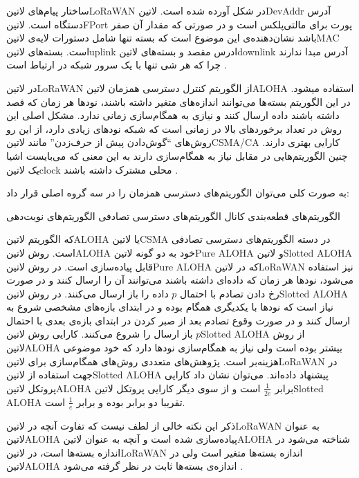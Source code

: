 ساختار پیام‌های ‌لاتین{LoRaWAN} در شکل  آورده شده است. ‌لاتین{DevAddr} آدرس دستگاه است.
‌لاتین{FPort} پورت برای مالتی‌پلکس است و در صورتی که مقدار آن صفر باشد نشان‌دهنده‌ی این موضوع است که بسته تنها شامل
دستورات لایه‌ی ‌لاتین{MAC} است. بسته‌های ‌لاتین{uplink} ادرس مقصد و بسته‌های ‌لاتین{downlink} آدرس مبدا ندارند
چرا که هر شی تنها با یک سرور شبکه در ارتباط است
.

در ‌لاتین{LoRaWAN} از الگوریتم کنترل دسترسی همزمان ‌لاتین{ALOHA} استفاده میشود. در این الگوریتم بسته‌ها می‌توانند اندازه‌های متغیر داشته باشند، نودها هر زمان که قصد داشته باشند داده ارسال کنند و نیازی به همگام‌سازی زمانی ندارد.
مشکل اصلی این روش در تعداد برخوردهای بالا در زمانی است که شبکه نودهای زیادی دارد، از این رو روش‌های ``گوش‌دادن پیش از حرف‌زدن'' مانند ‌لاتین{CSMA/CA} کارایی بهتری دارند.
چنین الگوریتم‌هایی در مقابل نیاز به همگام‌سازی دارند به این معنی که می‌بایست اشیا یک ‌لاتین{clock} محلی مشترک داشته باشند
.

به صورت کلی می‌توان الگوریتم‌های دسترسی همزمان را در سه گروه اصلی قرار داد:

 الگوریتم‌های قطعه‌بندی کانال
 الگوریتم‌های دسترسی تصادفی
 الگوریتم‌های نوبت‌دهی

که الگوریتم ‌لاتین{ALOHA} یا ‌لاتین{CSMA} در دسته الگوریتم‌های دسترسی تصادفی است. روش ‌لاتین{ALOHA} خود به دو گونه ‌لاتین{Pure ALOHA} و ‌لاتین{Slotted ALOHA}
قابل پیاده‌سازی است. در روش ‌لاتین{Pure ALOHA} که در ‌لاتین{LoRaWAN} نیز استفاده می‌شود، نودها هر زمان که داده‌ای داشته باشند می‌توانند آن را ارسال کنند و در صورت رخ دادن تصادم
با احتمال $p$ داده را باز ارسال می‌کنند. در روش ‌لاتین{Slotted ALOHA} نیاز است که نودها با یکدیگری همگام بوده و در ابتدای بازه‌های مشخصی شروع به ارسال کنند و در صورت
وقوع تصادم بعد از صبر کردن در ابتدای بازه‌ی بعدی با احتمال $p$ باز ارسال را شروع می‌کنند. کارایی روش ‌لاتین{Slotted ALOHA} از روش ‌لاتین{ALOHA} بیشتر بوده است ولی نیاز به همگام‌سازی نودها دارد
که خود موضوعی هزینه‌بر است. پژوهش‌های متعددی روش‌های همگام‌سازی برای ‌لاتین{LoRaWAN} در جهت استفاده از ‌لاتین{Slotted ALOHA} پیشنهاد داده‌اند.
می‌توان نشان داد کارایی پروتکل ‌لاتین{ALOHA} برابر $\frac{1}{2e}$ است و از سوی دیگر کارایی پروتکل ‌لاتین{Slotted ALOHA} تقریبا دو برابر بوده و برابر $\frac{1}{e}$ است.

ذکر این نکته خالی از لطف نیست که تفاوت آنچه در ‌لاتین{LoRaWAN} به عنوان ‌لاتین{ALOHA} پیاده‌سازی شده است و آنچه به عنوان ‌لاتین{ALOHA} شناخته می‌شود در اندازه بسته‌ها است،
در ‌لاتین{LoRaWAN} اندازه بسته‌ها متغیر است ولی در ‌لاتین{ALOHA} اندازه‌ی بسته‌ها ثابت در نظر گرفته می‌شود
.

